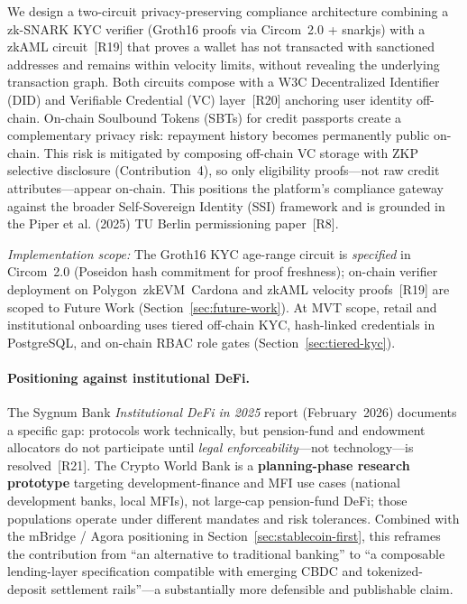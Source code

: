 \documentclass[12pt,a4paper]{report}
\begin{document}
\begin{description}[leftmargin=0pt]
\item[\textbf{Contribution 4 --- Compliance-Aware ZKP / zkAML Identity Pathway.}]
We design a two-circuit privacy-preserving compliance architecture combining a zk-SNARK KYC verifier (Groth16 proofs via Circom~2.0 + snarkjs) with a zkAML circuit~[R19] that proves a wallet has not transacted with sanctioned addresses and remains within velocity limits, without revealing the underlying transaction graph. Both circuits compose with a W3C Decentralized Identifier (DID) and Verifiable Credential (VC) layer~[R20] anchoring user identity off-chain. On-chain Soulbound Tokens (SBTs) for credit passports create a complementary privacy risk: repayment history becomes permanently public on-chain. This risk is mitigated by composing off-chain VC storage with ZKP selective disclosure (Contribution~4), so only eligibility proofs---not raw credit attributes---appear on-chain. This positions the platform's compliance gateway against the broader Self-Sovereign Identity (SSI) framework and is grounded in the Piper et al. (2025) TU Berlin permissioning paper~[R8].

\textit{Implementation scope:} The Groth16 KYC age-range circuit is \textit{specified} in Circom~2.0 (Poseidon hash commitment for proof freshness); on-chain verifier deployment on Polygon~zkEVM~Cardona and zkAML velocity proofs~[R19] are scoped to Future Work (Section~\ref{sec:future-work}). At MVT scope, retail and institutional onboarding uses tiered off-chain KYC, hash-linked credentials in PostgreSQL, and on-chain RBAC role gates (Section~\ref{sec:tiered-kyc}).

\end{description}

\paragraph{Positioning against institutional DeFi.}
The Sygnum Bank \textit{Institutional DeFi in 2025} report (February~2026) documents a specific gap: protocols work technically, but pension-fund and endowment allocators do not participate until \textit{legal enforceability}---not technology---is resolved~[R21]. The Crypto World Bank is a \textbf{planning-phase research prototype} targeting development-finance and MFI use cases (national development banks, local MFIs), not large-cap pension-fund DeFi; those populations operate under different mandates and risk tolerances. Combined with the mBridge / Agora positioning in Section~\ref{sec:stablecoin-first}, this reframes the contribution from ``an alternative to traditional banking'' to ``a composable lending-layer specification compatible with emerging CBDC and tokenized-deposit settlement rails''---a substantially more defensible and publishable claim.
\end{document}
